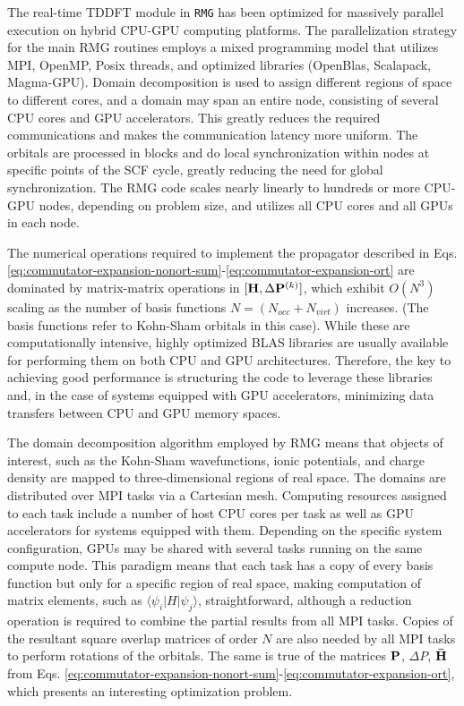 \documentclass[journal=jctcce,manuscript=article,etalmode=truncate,maxauthors=10,layout=twocolumn,9pt]{achemso}   %
\begin{document}
The real-time TDDFT module in \texttt{RMG} has been  optimized for massively parallel execution  on hybrid CPU-GPU  computing platforms.
The parallelization strategy for the main RMG routines employs a mixed programming model that utilizes MPI, OpenMP, Posix threads, and optimized libraries (OpenBlas, Scalapack, Magma-GPU). Domain decomposition is used to assign different regions of space to different cores, and a domain may span an entire node, consisting of several CPU cores and GPU accelerators. This greatly reduces the required communications and makes the communication latency more uniform. The orbitals are processed in blocks and do local synchronization within nodes at specific points of the SCF cycle, greatly reducing the need for global synchronization. The RMG code scales nearly linearly to hundreds or more CPU-GPU nodes, depending on problem size, and utilizes all CPU cores and all GPUs in each node.

The numerical operations required to implement the propagator described in 
Eqs.  \ref{eq:commutator-expansion-nonort-sum}-\ref{eq:commutator-expansion-ort} 
 are dominated by matrix-matrix operations in $[\vb{H}, \Delta \vb{P}^{(k)}]$, 
which exhibit $O(N^3)$  scaling as the number of basis functions $N=(N_{occ}+N_{virt})$ increases. 
(The basis functions refer to Kohn-Sham orbitals in this case). While these are computationally intensive, highly 
optimized BLAS libraries are usually available for performing them on both CPU and GPU architectures. 
Therefore, the key to achieving good performance is structuring the code to leverage these libraries and,
in the case of systems equipped with GPU accelerators, minimizing data transfers between CPU and GPU memory spaces.

The domain decomposition algorithm employed by RMG means that objects of interest, such as the Kohn-Sham 
wavefunctions, ionic potentials, and charge density are mapped to three-dimensional regions of real space. 
The domains are distributed over MPI tasks via a Cartesian mesh. Computing resources assigned to each task 
include a number of host CPU cores per task as well as GPU accelerators for systems equipped with them. 
Depending on the specific system configuration, GPUs may be shared with several tasks running on the same 
compute node. 
This paradigm means that each task has a copy of every basis function but only for a specific region of real space,  
making computation of matrix elements, such as $\langle\psi_i|H|\psi_j \rangle$, straightforward, although a reduction 
operation is required to combine the partial results from all MPI tasks.  Copies of the resultant 
square overlap matrices of order $N$ are also needed by all MPI tasks to perform rotations of the orbitals. 
The same is true of the matrices $\vb{P}$, $\Delta P$, $\vb{\bar H}$ from 
Eqs. \ref{eq:commutator-expansion-nonort-sum}-\ref{eq:commutator-expansion-ort}, 
which presents an interesting optimization problem.  
\end{document}
